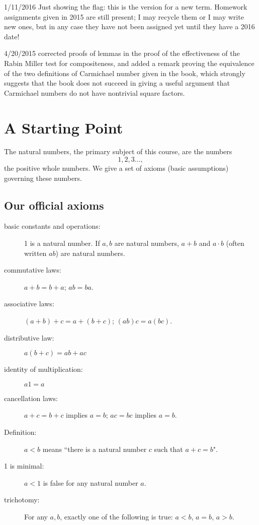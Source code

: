 \documentclass[12pt]{article}
\begin{document}
1/11/2016  Just showing the flag:  this is the version for a new term.  Homework assignments given in 2015 are still present; I may recycle them or I may write new ones, but in any case they have not been assigned yet until they have a 2016 date!

4/20/2015 corrected proofs of lemmas in the proof of the effectiveness of the Rabin Miller test for compositeness, and added a remark proving the equivalence of the two definitions of Carmichael number given in the book, which strongly suggests that the book does not succeed in giving a useful argument that Carmichael numbers do not have nontrivial square factors.

\tableofcontents

\newpage

\section{A Starting Point}

The natural numbers, the primary subject of this course, are the numbers $$1,2,3\ldots, $$  the positive whole numbers.
We give a set of axioms (basic assumptions) governing these numbers.

\subsection{Our official axioms}

\begin{description}

\item[basic constants and operations:]  1 is a natural number.  If $a,b$ are natural numbers, $a+b$ and $a\cdot b$ (often written $ab$) are natural numbers.

\item[commutative laws:]  $a+b=b+a$; $ab=ba$. 

\item[associative laws:]  $(a+b)+c=a+(b+c)$;  $(ab)c=a(bc)$.

\item[distributive law:]  $a(b+c)=ab+ac$

\item[identity of multiplication:]  $a1=a$

\item[cancellation laws:]  $a+c=b+c$ implies $a=b$;  $ac=bc$ implies $a=b$.

\item[Definition:]  $a<b$ means ``there is a natural number $c$ such that $a+c=b$".

\item[1 is minimal:]  $a<1$ is false for any natural number $a$.

\item[trichotomy:]  For any $a,b$, exactly one of the following is true:  $a<b$, $a=b$, $a>b$.

\end{description}
\end{document}
